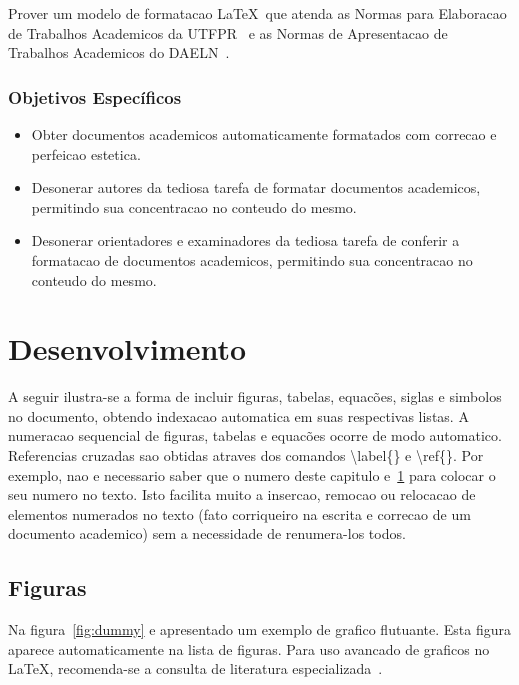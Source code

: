 \documentclass[openright]{normas-utf-tex} %
\begin{document}
Prover um modelo de formatacao \LaTeX\ que atenda as Normas para Elaboracao de
Trabalhos Academicos da UTFPR~\cite{UTFPR2008} e as Normas de Apresentacao de
Trabalhos Academicos do DAELN~\cite{DAELN2006}.

\subsection{Objetivos Específicos}

\begin{itemize}
	\item Obter documentos academicos automaticamente formatados com correcao e perfeicao estetica.
	\item Desonerar autores da tediosa tarefa de formatar documentos academicos, permitindo sua concentracao no conteudo do mesmo.
	\item Desonerar orientadores e examinadores da tediosa tarefa de conferir a formatacao de documentos academicos, permitindo sua concentracao no conteudo do mesmo.
\end{itemize}


\chapter{Desenvolvimento}
\label{chap:desenv}

A seguir ilustra-se a forma de incluir figuras, tabelas, equac\~oes, siglas e simbolos no documento, obtendo indexacao automatica em suas respectivas listas. A numeracao sequencial de figuras, tabelas e equac\~oes ocorre de modo automatico. Referencias cruzadas sao obtidas atraves dos comandos {\ttfamily \textbackslash label\{\}} e {\ttfamily \textbackslash ref\{\}}. Por exemplo, nao e necessario saber que o numero deste capitulo e~\ref{chap:desenv} para colocar o seu numero no texto. Isto facilita muito a insercao, remocao ou relocacao de elementos numerados no texto (fato corriqueiro na escrita e correcao de um documento academico) sem a necessidade de renumera-los todos.

\section{Figuras}

Na figura~\ref{fig:dummy} e apresentado um exemplo de grafico flutuante. Esta figura aparece automaticamente na lista de figuras. Para uso avancado de graficos no \LaTeX, recomenda-se a consulta de literatura especializada~\cite{Goossens2007}.
\end{document}

